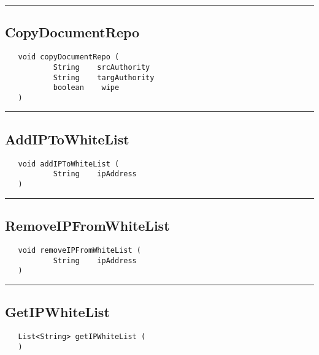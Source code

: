 \rule{15cm}{2pt}
\subsection{CopyDocumentRepo}
\label{Api:CopyDocumentRepo}
\begin{verbatim}
   void copyDocumentRepo (
           String    srcAuthority
           String    targAuthority
           boolean    wipe
   )
\end{verbatim}



\rule{15cm}{2pt}
\subsection{AddIPToWhiteList}
\label{Api:AddIPToWhiteList}
\begin{verbatim}
   void addIPToWhiteList (
           String    ipAddress
   )
\end{verbatim}



\rule{15cm}{2pt}
\subsection{RemoveIPFromWhiteList}
\label{Api:RemoveIPFromWhiteList}
\begin{verbatim}
   void removeIPFromWhiteList (
           String    ipAddress
   )
\end{verbatim}



\rule{15cm}{2pt}
\subsection{GetIPWhiteList}
\label{Api:GetIPWhiteList}
\begin{verbatim}
   List<String> getIPWhiteList (
   )
\end{verbatim}



